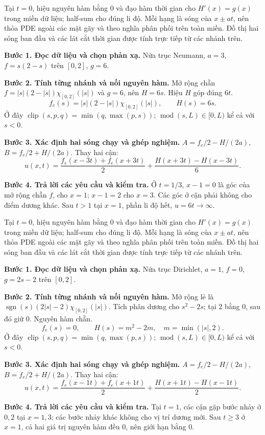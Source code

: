 Tại $t=0$, hiệu nguyên hàm bằng $0$ và đạo hàm thời gian cho $H'(x)=g(x)$ trong miền dữ liệu; half-sum cho đúng li độ. Mỗi hạng là sóng của $x\pm at$, nên thỏa PDE ngoài các mặt gãy và theo nghĩa phân phối trên toàn miền. Đồ thị hai sóng ban đầu và các lát cắt thời gian được tính trực tiếp từ các nhánh trên.

\textbf{Bước 1. Đọc dữ liệu và chọn phản xạ.} Nửa trục Neumann, $a=3$, $f=s(2-s)$ trên $[0,2]$, $g=6$.

\textbf{Bước 2. Tính từng nhánh và nối nguyên hàm.} Mở rộng chẵn $f=|s|(2-|s|)\chi_{[0,2]}(|s|)$ và $g=6$, nên $H=6s$. Hiệu $H$ góp đúng $6t$.
\[f_e(s)=|s|(2-|s|)\chi_{[0,2]}(|s|),\qquad H(s)=6s.\]
Ở đây $\operatorname{clip}(s,p,q)=\min(q,\max(p,s))$; $\operatorname{mod}(s,L)\in[0,L)$ kể cả với $s<0$.

\textbf{Bước 3. Xác định hai sóng chạy và ghép nghiệm.} $A=f_e/2-H/(2a)$, $B=f_e/2+H/(2a)$. Thay hai cận:
\[u(x,t)=\frac{f_e(x-3t)+f_e(x+3t)}2+\frac{H(x+3t)-H(x-3t)}{6}.\]

\textbf{Bước 4. Trả lời các yêu cầu và kiểm tra.} Ở $t=1/3$, $x-1=0$ là góc của mở rộng chẵn $f$, cho $x=1$; $x-1=2$ cho $x=3$. Các góc ở cận phải không cho điểm dương khác. Sau $t>1$ tại $x=1$, phần li độ hết, $u=6t\to\infty$.

Tại $t=0$, hiệu nguyên hàm bằng $0$ và đạo hàm thời gian cho $H'(x)=g(x)$ trong miền dữ liệu; half-sum cho đúng li độ. Mỗi hạng là sóng của $x\pm at$, nên thỏa PDE ngoài các mặt gãy và theo nghĩa phân phối trên toàn miền. Đồ thị hai sóng ban đầu và các lát cắt thời gian được tính trực tiếp từ các nhánh trên.

\textbf{Bước 1. Đọc dữ liệu và chọn phản xạ.} Nửa trục Dirichlet, $a=1$, $f=0$, $g=2s-2$ trên $[0,2]$.

\textbf{Bước 2. Tính từng nhánh và nối nguyên hàm.} Mở rộng lẻ là $\operatorname{sgn}(s)(2|s|-2)\chi_{[0,2]}(|s|)$. Tích phân dương cho $s^2-2s$; tại $2$ bằng $0$, sau đó giữ $0$. Nguyên hàm chẵn.
\[f_e(s)=0,\qquad H(s)=m^2-2m,\quad m=\min(|s|,2).\]
Ở đây $\operatorname{clip}(s,p,q)=\min(q,\max(p,s))$; $\operatorname{mod}(s,L)\in[0,L)$ kể cả với $s<0$.

\textbf{Bước 3. Xác định hai sóng chạy và ghép nghiệm.} $A=f_e/2-H/(2a)$, $B=f_e/2+H/(2a)$. Thay hai cận:
\[u(x,t)=\frac{f_e(x-1t)+f_e(x+1t)}2+\frac{H(x+1t)-H(x-1t)}{2}.\]

\textbf{Bước 4. Trả lời các yêu cầu và kiểm tra.} Tại $t=1$, các cận gặp bước nhảy ở $0,2$ tại $x=1,3$; các bước nhảy khác không cho vị trí dương mới. Sau $t\ge3$ ở $x=1$, cả hai giá trị nguyên hàm đều $0$, nên giới hạn bằng $0$.

